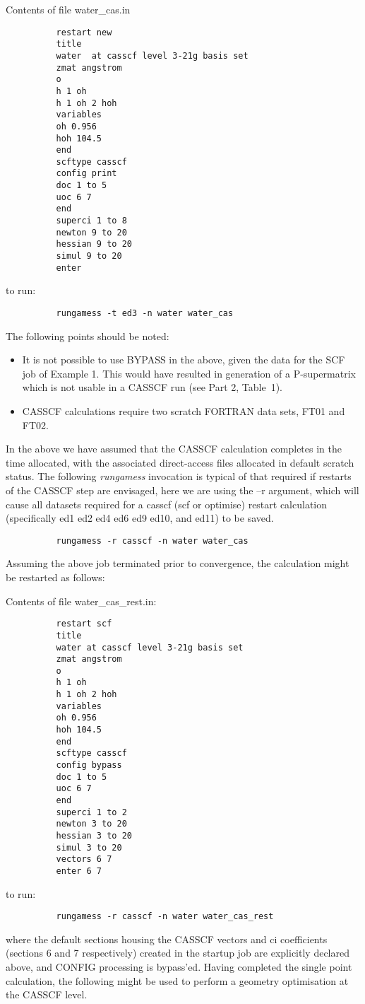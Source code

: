 \documentclass[11pt,fleqn]{article}
\begin{document}
Contents of file water\_cas.in
{
\footnotesize
\begin{verbatim}
          restart new
          title
          water  at casscf level 3-21g basis set
          zmat angstrom
          o
          h 1 oh
          h 1 oh 2 hoh
          variables
          oh 0.956
          hoh 104.5
          end
          scftype casscf
          config print
          doc 1 to 5
          uoc 6 7
          end
          superci 1 to 8
          newton 9 to 20
          hessian 9 to 20
          simul 9 to 20
          enter
\end{verbatim}
}
to run:
{
\footnotesize
\begin{verbatim}
          rungamess -t ed3 -n water water_cas
\end{verbatim}
}
The following points should be noted:
\begin{itemize}
\item  It is not possible to use BYPASS in the above, given the data
for the SCF job of Example 1. This would have resulted in
generation of a P-supermatrix which is not usable in
a CASSCF run (see Part 2, Table~1).
\item  CASSCF calculations require two scratch FORTRAN data sets, FT01
and FT02. 
\end{itemize}
In the above we have assumed that the CASSCF calculation
completes in the time allocated, with the associated 
direct-access files allocated in default scratch status.
The following {\em rungamess} invocation
is typical of that required if restarts of the CASSCF step
are envisaged, here we are using the --r argument,
which will cause all datasets required for a casscf 
(scf or optimise) restart calculation
(specifically ed1 ed2 ed4 ed6 ed9 ed10, and ed11) to be saved.

{
\footnotesize
\begin{verbatim}
          rungamess -r casscf -n water water_cas
\end{verbatim}
}
Assuming the above job terminated prior to convergence, the
calculation might be restarted as follows:

Contents of file water\_cas\_rest.in:
{
\footnotesize
\begin{verbatim}
          restart scf
          title
          water at casscf level 3-21g basis set
          zmat angstrom
          o
          h 1 oh
          h 1 oh 2 hoh
          variables
          oh 0.956
          hoh 104.5
          end
          scftype casscf
          config bypass
          doc 1 to 5
          uoc 6 7
          end
          superci 1 to 2
          newton 3 to 20
          hessian 3 to 20
          simul 3 to 20
          vectors 6 7
          enter 6 7
\end{verbatim}
}
to run:
{
\footnotesize
\begin{verbatim}
          rungamess -r casscf -n water water_cas_rest
\end{verbatim}
}
where the default sections housing the CASSCF vectors and
ci coefficients (sections 6 and 7 respectively)  created
in the startup job are explicitly declared above, and CONFIG
processing is bypass'ed.
Having completed the single point calculation, the
following might be used to perform a geometry optimisation
at the CASSCF level. 
\end{document}
